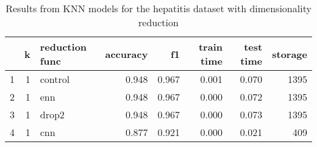 \begin{table}
\centering
\caption{Results from KNN models for the hepatitis dataset with dimensionality reduction}
\label{tab:knn_reduction_results_hepatitis}
\begin{tabular}{rrlrrrrr}
\toprule
 & k & reduction func & accuracy & f1 & train time & test time & storage \\
\midrule
1 & 1 & control & 0.948 & 0.967 & 0.001 & 0.070 & 1395 \\
2 & 1 & enn & 0.948 & 0.967 & 0.000 & 0.072 & 1395 \\
3 & 1 & drop2 & 0.948 & 0.967 & 0.000 & 0.073 & 1395 \\
4 & 1 & cnn & 0.877 & 0.921 & 0.000 & 0.021 & 409 \\
\bottomrule
\end{tabular}
\end{table}
